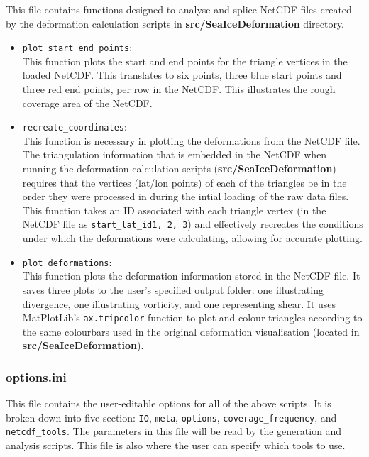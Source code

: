 \documentclass{article}
\begin{document}
            This file contains functions designed to analyse and splice NetCDF files created by the deformation calculation scripts in \textbf{src/SeaIceDeformation} directory.
            \begin{itemize}
                \item \verb?plot_start_end_points?: \\ This function plots the start and end points for the triangle vertices in the loaded NetCDF. This translates to six points, three blue start points and three red end points, per row in the NetCDF. This illustrates the rough coverage area of the NetCDF.
                \item \verb?recreate_coordinates?: \\ This function is necessary in plotting the deformations from the NetCDF file. The triangulation information that is embedded in the NetCDF when running the deformation calculation scripts (\textbf{src/SeaIceDeformation}) requires that the vertices (lat/lon points) of each of the triangles be in the order they were processed in during the intial loading of the raw data files. This function takes an ID associated with each triangle vertex (in the NetCDF file as \verb?start_lat_id1, 2, 3?) and effectively recreates the conditions under which the deformations were calculating, allowing for accurate plotting.
                \item \verb?plot_deformations?: \\ This function  plots the deformation information stored in the NetCDF file. It saves three plots to the user's specified output folder: one illustrating divergence, one illustrating vorticity, and one representing shear. It uses MatPlotLib's \verb?ax.tripcolor? function to plot and colour triangles according to the same colourbars used in the original deformation visualisation (located in \textbf{src/SeaIceDeformation}).
            \end{itemize}

        \subsubsection{\textbf{options.ini}}

            This file contains the user-editable options for all of the above scripts. It is broken down into five section: \verb?IO?, \verb?meta?, \verb?options?, \verb?coverage_frequency?, and \verb?netcdf_tools?. The parameters in this file will be read by the generation and analysis scripts. This file is also where the user can specify which tools to use.
\end{document}
